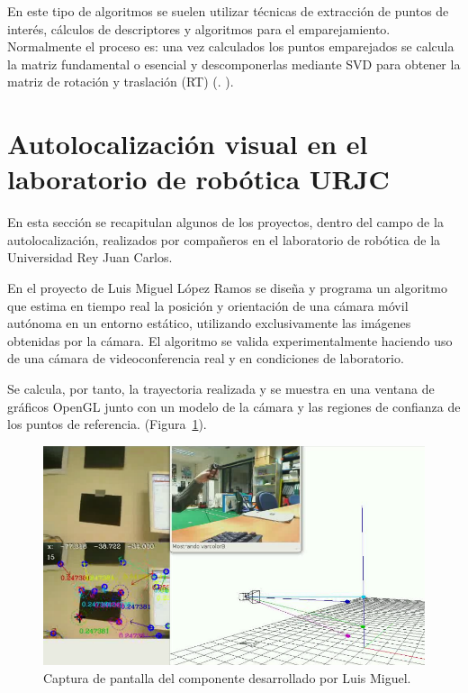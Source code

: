 En este tipo de algoritmos se suelen utilizar técnicas de extracción de puntos de interés, cálculos de descriptores y algoritmos para el emparejamiento. Normalmente el proceso es: una vez calculados los puntos emparejados se calcula la matriz fundamental o esencial y descomponerlas mediante SVD para obtener la matriz de rotación y traslación (RT) (\cite{Reference3}. \cite{Reference4}).

\section{Autolocalización visual en el laboratorio de robótica URJC}

En esta sección se recapitulan algunos de los proyectos, dentro del campo de la autolocalización, realizados por compañeros en el laboratorio de robótica de la Universidad Rey Juan Carlos.

En el proyecto de Luis Miguel López Ramos \parencite{ref1} se diseña y programa un algoritmo que estima en tiempo real la posición y orientación de una cámara móvil autónoma en un entorno estático, utilizando exclusivamente las imágenes obtenidas por la cámara. El algoritmo se valida experimentalmente haciendo uso de una cámara de videoconferencia real y en condiciones de laboratorio.

Se calcula, por tanto, la trayectoria realizada y se muestra en una ventana de gráficos OpenGL junto con un modelo de la cámara y las regiones de confianza de los puntos de referencia. (Figura~\ref{fig:ramos}).

\begin{figure}[th]
\centering
\includegraphics[scale=0.463]{Figures/cap-ramos.png}
\decoRule
\caption[Captura de pantalla, PFC de Luis Miguel]{Captura de pantalla del componente desarrollado por Luis Miguel.}
\label{fig:ramos}
\end{figure}

